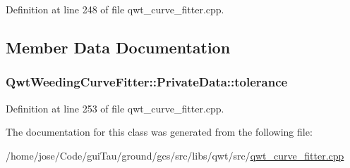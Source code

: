 Definition at line 248 of file qwt\-\_\-curve\-\_\-fitter.\-cpp.



\subsection{Member Data Documentation}
\hypertarget{class_qwt_weeding_curve_fitter_1_1_private_data_a816f87a8a58c847c1d3d2248bf767964}{
\subsubsection[{tolerance}]{ Qwt\-Weeding\-Curve\-Fitter\-::\-Private\-Data\-::tolerance}}\label{class_qwt_weeding_curve_fitter_1_1_private_data_a816f87a8a58c847c1d3d2248bf767964}


Definition at line 253 of file qwt\-\_\-curve\-\_\-fitter.\-cpp.



The documentation for this class was generated from the following file\-:\begin{DoxyCompactItemize}
\item 
/home/jose/\-Code/gui\-Tau/ground/gcs/src/libs/qwt/src/\hyperlink{qwt__curve__fitter_8cpp}{qwt\-\_\-curve\-\_\-fitter.\-cpp}\end{DoxyCompactItemize}
